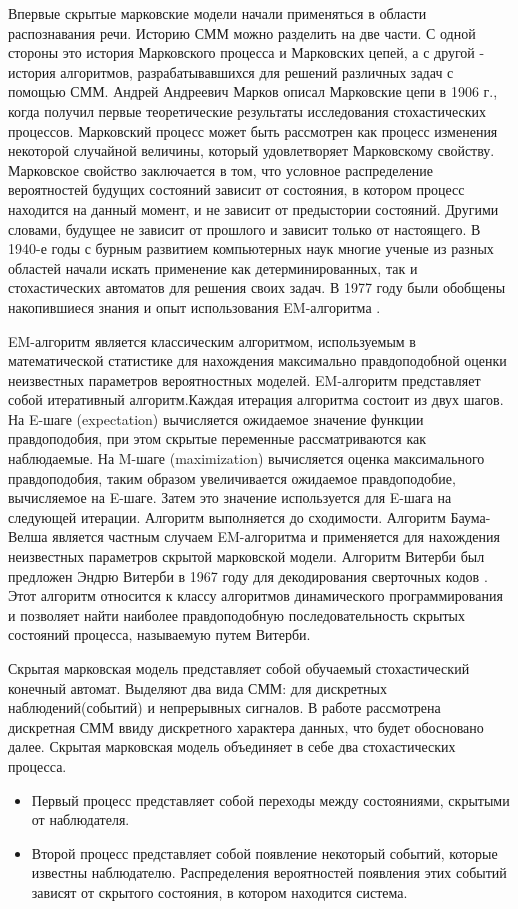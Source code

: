 Впервые скрытые марковские модели начали применяться в области распознавания речи. Историю СММ можно разделить на две части. \cite{kouemou} С одной стороны это история Марковского процесса и Марковских цепей, а с другой - история алгоритмов, разрабатывавшихся для решений различных задач с помощью СММ. Андрей Андреевич Марков описал Марковские цепи в 1906 г., когда получил первые теоретические результаты исследования стохастических процессов. Марковский процесс может быть рассмотрен как процесс изменения некоторой случайной величины, который удовлетворяет Марковскому свойству. Марковское свойство заключается в том, что условное распределение вероятностей будущих состояний зависит от состояния, в котором процесс находится на данный момент, и не зависит от предыстории состояний. Другими словами, будущее не зависит от прошлого и зависит только от настоящего. В 1940-е годы с бурным развитием компьютерных наук многие ученые из разных областей начали искать применение как детерминированных, так и стохастических автоматов для решения своих задач. В 1977 году были обобщены накопившиеся знания и опыт использования EM-алгоритма \cite{dempster1977maximum}. 

EM-алгоритм является классическим алгоритмом, используемым в математической статистике для нахождения максимально правдоподобной оценки неизвестных параметров вероятностных моделей. EM-алгоритм представляет собой итеративный алгоритм.Каждая итерация алгоритма состоит из двух шагов. На E-шаге (expectation) вычисляется ожидаемое значение функции правдоподобия, при этом скрытые переменные рассматриваются как наблюдаемые. На M-шаге (maximization) вычисляется оценка максимального правдоподобия, таким образом увеличивается ожидаемое правдоподобие, вычисляемое на E-шаге. Затем это значение используется для E-шага на следующей итерации. Алгоритм выполняется до сходимости. Алгоритм Баума-Велша является частным случаем EM-алгоритма и применяется для нахождения неизвестных параметров скрытой марковской модели. Алгоритм Витерби был предложен Эндрю Витерби в 1967 году для декодирования сверточных кодов \cite{viterbi1967error}. Этот алгоритм относится к классу алгоритмов динамического программирования и позволяет найти наиболее правдоподобную последовательность скрытых состояний процесса, называемую путем Витерби.

Скрытая марковская модель представляет собой обучаемый стохастический конечный автомат. Выделяют два вида СММ: для дискретных наблюдений(событий) и непрерывных сигналов. В работе рассмотрена дискретная СММ ввиду дискретного характера данных, что будет обосновано далее. Скрытая марковская модель объединяет в себе два стохастических процесса.
\begin{itemize}
\item
Первый процесс представляет собой переходы между состояниями, скрытыми от наблюдателя.
\item
Второй процесс представляет собой появление некоторый событий, которые известны наблюдателю. Распределения вероятностей появления этих событий зависят от скрытого состояния, в котором находится система.
\end{itemize}


